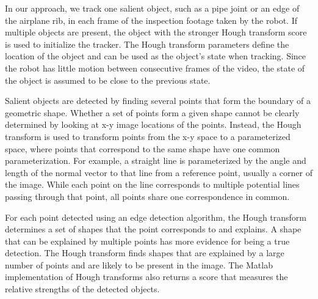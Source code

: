 \documentclass[letterpaper, 10 pt, conference]{ieeeconf}
\begin{document}

In our approach, we track one salient object, such as a pipe joint or an edge of the airplane rib, in each frame of the inspection footage taken by the robot. If multiple objects are present, the object with the stronger Hough transform score is used to initialize the tracker. The Hough transform parameters define the location of the object and can be used as the object's state when tracking. Since the robot has little motion between consecutive frames of the video, the state of the object is assumed to be close to the previous state.


Salient objects are detected by finding several points that form the boundary of a geometric shape. Whether a set of points form a given shape cannot be clearly determined by looking at x-y image locations of the points. Instead, the Hough transform is used to transform points from the x-y space to a parameterized space, where points that correspond to the same shape have one common parameterization. For example, a straight line is parameterized by the angle and length of the normal vector to that line from a reference point, usually a corner of the image. While each point on the line corresponds to multiple potential lines passing through that point, all points share one correspondence in common.


For each point detected using an edge detection algorithm, the Hough transform determines a set of shapes that the point corresponds to and explains. A shape that can be explained by multiple points has more evidence for being a true detection. The Hough transform finds shapes that are explained by a large number of points and are likely to be present in the image. The Matlab implementation of Hough transforms also returns a score that measures the relative strengths of the detected objects.
\end{document}

